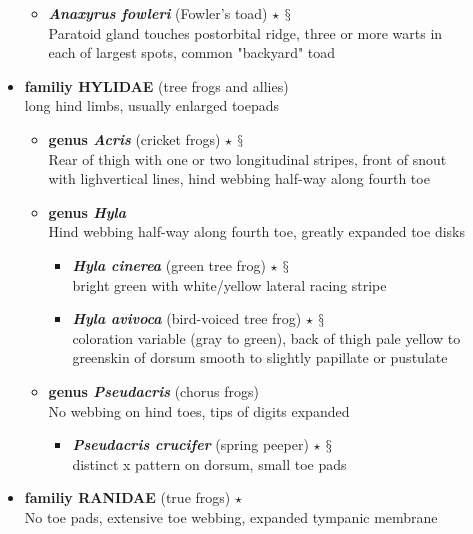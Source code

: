 \documentclass[a4paper,12pt]{article}
\begin{document}
\begin{description}
\begin{itemize}
  \begin{itemize}
      \item{\textbf{\textit{   Anaxyrus fowleri}} (Fowler's toad) $\star$ $\mathsection$} \\ Paratoid gland touches postorbital ridge, three or more warts in each of largest spots, common "backyard" toad
  \end{itemize}
  \item{\textbf{familiy HYLIDAE} (tree frogs and allies)} \\ long hind limbs, usually enlarged toepads
  \begin{itemize}
    \item{\textbf{genus\textit{   Acris}} (cricket frogs) $\star$ $\mathsection$} \\ Rear of thigh with one or two longitudinal stripes, front of snout with lighvertical lines, hind webbing half-way along fourth toe
    \item{\textbf{genus\textit{   Hyla}}} \\ Hind webbing half-way along fourth toe, greatly expanded toe disks
    \begin{itemize}
      \item{\textbf{\textit{   Hyla cinerea}} (green tree frog) $\star$ $\mathsection$} \\ bright green with white/yellow lateral racing stripe
      \item{\textbf{\textit{   Hyla avivoca}} (bird-voiced tree frog) $\star$ $\mathsection$} \\ coloration variable (gray to green), back of thigh pale yellow to greenskin of dorsum smooth to slightly papillate or pustulate
    \end{itemize}
    \item{\textbf{genus\textit{   Pseudacris}} (chorus frogs)} \\ No webbing on hind toes, tips of digits expanded
    \begin{itemize}
      \item{\textbf{\textit{   Pseudacris crucifer}} (spring peeper) $\star$ $\mathsection$} \\ distinct x pattern on dorsum, small toe pads
    \end{itemize}
  \end{itemize}
  \item{\textbf{familiy RANIDAE} (true frogs) $\star$} \\ No toe pads, extensive toe webbing, expanded tympanic membrane
  \begin{itemize}

\end{itemize}
\end{itemize}
\end{description}
\end{document}
